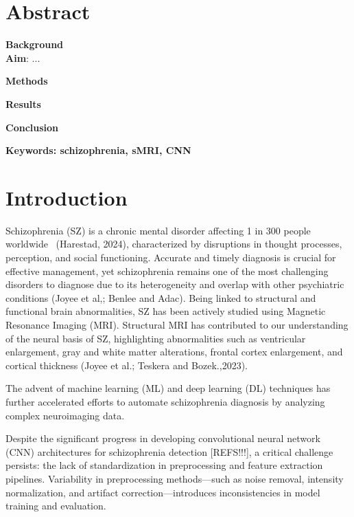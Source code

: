 



\maketitle

\section{Abstract}

\textbf{Background}\\
\lipsum[1]
\textbf{Aim}: ...

\textbf{Methods}\\
\lipsum[1]

\textbf{Results}\\
\lipsum[1]

\textbf{Conclusion}\\
\lipsum[1]

\textbf{Keywords: schizophrenia, sMRI, CNN}

\section{Introduction}

Schizophrenia (SZ) is a chronic mental disorder affecting 1 in 300 people worldwide~\cite{Zhang2022} (Harestad, 2024), characterized by disruptions in thought processes, perception, and social functioning. Accurate and timely diagnosis is crucial for effective management, yet schizophrenia remains one of the most challenging disorders to diagnose due to its heterogeneity and overlap with other psychiatric conditions (Joyee et al,; Benlee and Adac). Being linked to structural and functional brain abnormalities, SZ has been actively studied using Magnetic Resonance Imaging (MRI). Structural MRI has contributed to our understanding of the neural basis of SZ, highlighting abnormalities such as ventricular enlargement, gray and white matter alterations, frontal cortex enlargement, and cortical thickness (Joyee et al.; Teskera and Bozek.,2023).


The advent of machine learning (ML) and deep learning (DL) techniques has further accelerated efforts to automate schizophrenia diagnosis by analyzing complex neuroimaging data.

Despite the significant progress in developing convolutional neural network (CNN) architectures for schizophrenia detection [REFS!!!], a critical challenge persists: the lack of standardization in preprocessing and feature extraction pipelines. Variability in preprocessing methods---such as noise removal, intensity normalization, and artifact correction---introduces inconsistencies in model training and evaluation.

